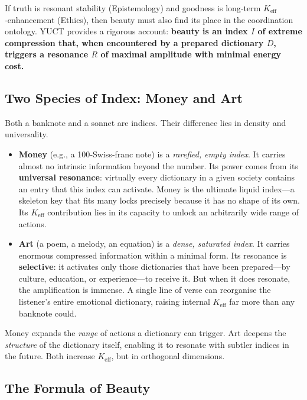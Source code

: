 \documentclass[12pt,a4paper]{article}
\begin{document}
	If truth is resonant stability (Epistemology) and goodness is long‑term $K_{\mathrm{eff}}$‑enhancement (Ethics), then beauty must also find its place in the coordination ontology. YUCT provides a rigorous account: \textbf{beauty is an index $I$ of extreme compression that, when encountered by a prepared dictionary $D$, triggers a resonance $R$ of maximal amplitude with minimal energy cost.}
	
	\subsection{Two Species of Index: Money and Art}
	
	Both a banknote and a sonnet are indices. Their difference lies in density and universality.
	
	\begin{itemize}[leftmargin=*]
		\item \textbf{Money} (e.g., a 100‑Swiss‑franc note) is a \emph{rarefied, empty index}. It carries almost no intrinsic information beyond the number. Its power comes from its \textbf{universal resonance}: virtually every dictionary in a given society contains an entry that this index can activate. Money is the ultimate liquid index---a skeleton key that fits many locks precisely because it has no shape of its own. Its $K_{\mathrm{eff}}$ contribution lies in its capacity to unlock an arbitrarily wide range of actions.
		\item \textbf{Art} (a poem, a melody, an equation) is a \emph{dense, saturated index}. It carries enormous compressed information within a minimal form. Its resonance is \textbf{selective}: it activates only those dictionaries that have been prepared---by culture, education, or experience---to receive it. But when it does resonate, the amplification is immense. A single line of verse can reorganise the listener’s entire emotional dictionary, raising internal $K_{\mathrm{eff}}$ far more than any banknote could.
	\end{itemize}
	
	Money expands the \emph{range} of actions a dictionary can trigger. Art deepens the \emph{structure} of the dictionary itself, enabling it to resonate with subtler indices in the future. Both increase $K_{\mathrm{eff}}$, but in orthogonal dimensions.
	
	\subsection{The Formula of Beauty}
	
\end{document}
